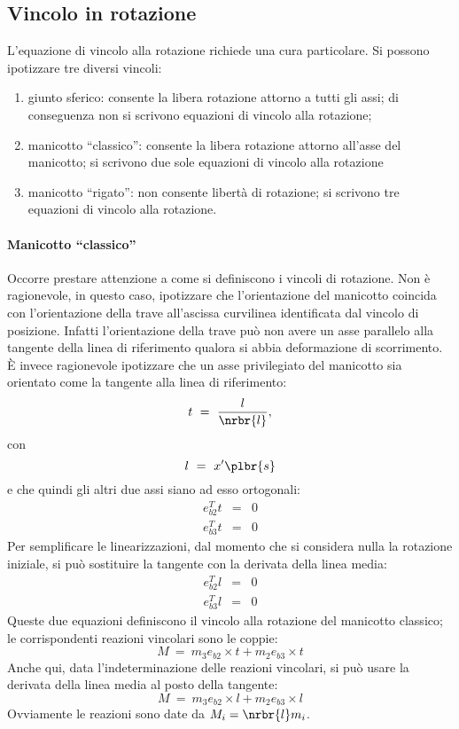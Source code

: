 \documentclass[12pt,dvips,fleqn,italian]{article}
\begin{document}
\subsection*{Vincolo in rotazione}
L'equazione di vincolo alla rotazione richiede una cura particolare.
Si possono ipotizzare tre diversi vincoli:
\begin{enumerate}
	\item giunto sferico: consente la libera rotazione attorno a tutti
	gli assi; di conseguenza non si scrivono equazioni di vincolo
	alla rotazione;
	\item manicotto ``classico'': consente la libera rotazione attorno
	all'asse del manicotto; si scrivono due sole equazioni di vincolo
	alla rotazione
	\item manicotto ``rigato'': non consente libert\`a di rotazione;
	si scrivono tre equazioni di vincolo alla rotazione.
\end{enumerate}


\paragraph*{Manicotto ``classico''}
Occorre prestare attenzione a come si definiscono i vincoli di rotazione.
Non \`e ragionevole, in questo caso, ipotizzare che l'orientazione 
del manicotto coincida con l'orientazione della trave all'ascissa
curvilinea identificata dal vincolo di posizione.
Infatti l'orientazione della trave pu\`o non avere un asse parallelo
alla tangente della linea di riferimento qualora si abbia deformazione
di scorrimento.
\`E invece ragionevole ipotizzare che un asse privilegiato del manicotto
sia orientato come la tangente alla linea di riferimento:
\begin{displaymath}
	t \ = \ \frac{l}{\nrbr{l}} ,
\end{displaymath}
con 
\begin{displaymath}
	l \ = \ x'\plbr{s}
\end{displaymath}
e che quindi gli altri due assi siano ad esso ortogonali:
\begin{eqnarray*}
	e_{b2}^T t & = & 0 \\
	e_{b3}^T t & = & 0
\end{eqnarray*}
Per semplificare le linearizzazioni, dal momento che si considera nulla
la rotazione iniziale, si pu\`o sostituire la tangente
con la derivata della linea media:
\begin{eqnarray*}
	e_{b2}^T l & = & 0 \\
	e_{b3}^T l & = & 0
\end{eqnarray*}
Queste due equazioni definiscono il vincolo alla rotazione del manicotto 
classico; le corrispondenti reazioni vincolari sono le coppie:
\begin{displaymath}
	M \ = \ m_3 e_{b2}\times{t} + m_2 e_{b3}\times{t}
\end{displaymath}
Anche qui, data l'indeterminazione delle reazioni vincolari, si pu\`o 
usare la derivata della linea media al posto della tangente:
\begin{displaymath}
	M \ = \ m_3 e_{b2}\times{l} + m_2 e_{b3}\times{l}
\end{displaymath}
Ovviamente le reazioni sono date da $M_i=\nrbr{l}m_i$.
\end{document}
